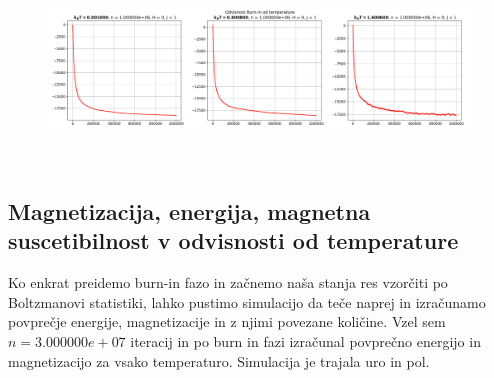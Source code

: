 \documentclass[11pt, a4paper]{article}
\begin{document}
 \begin{figure}[H]
\centering
  \includegraphics[width=17cm, height=5cm]{druga_domene1_burnin.png}

\end{figure}  
\subsection{Magnetizacija, energija, magnetna suscetibilnost v odvisnosti od temperature}
Ko enkrat preidemo burn-in fazo in začnemo naša stanja res vzorčiti po Boltzmanovi statistiki, lahko pustimo simulacijo da teče naprej in izračunamo povprečje energije, magnetizacije in z njimi povezane količine. Vzel sem $n = 3.000000e+07$ iteracij in po burn in fazi izračunal povprečno energijo in magnetizacijo za vsako temperaturo. Simulacija je trajala uro in pol.
\end{document}
